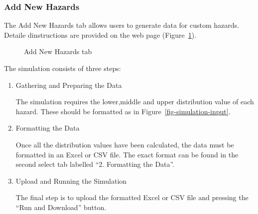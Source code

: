 \documentclass[
  letterpaper,
  DIV=11,
  numbers=noendperiod]{scrartcl}
\begin{document}
\subsubsection{Add New Hazards}\label{add-new-hazards}

The Add New Hazards tab allows users to generate data for custom
hazards. Detaile dinstructions are provided on the web page
(Figure~\ref{fig-simulation}).

\begin{figure}


\caption{\label{fig-simulation}Add New Hazards tab}

\end{figure}%

The simulation consists of three steps:

\begin{enumerate}
\def\labelenumi{\arabic{enumi}.}
\item
  Gathering and Preparing the Data

  The simulation requires the lower,middle and upper distribution value
  of each hazard. These should be formatted as in
  Figure~\ref{fig-simulation-input}.
\item
  Formatting the Data

  Once all the distribution values have been calculated, the data must
  be formatted in an Excel or CSV file. The exact format can be found in
  the second select tab labelled ``2. Formatting the Data''.
\item
  Upload and Running the Simulation

  The final step is to upload the formatted Excel or CSV file and
  pressing the ``Run and Download'' button.
\end{enumerate}
\end{document}
